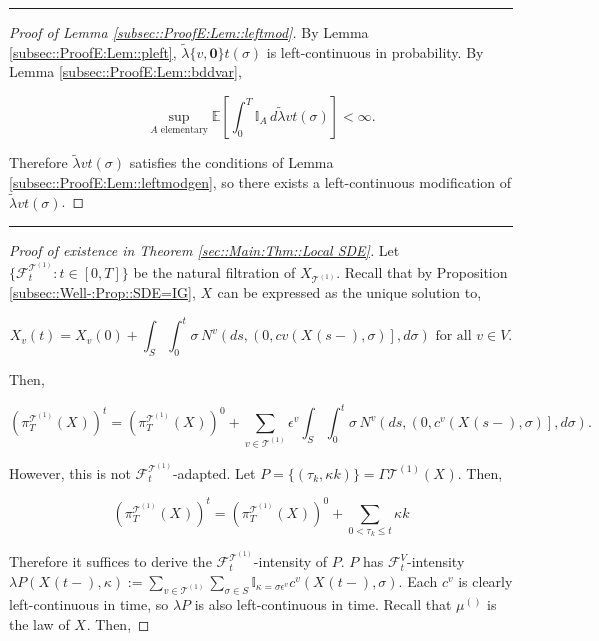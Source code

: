 \documentclass[12pt]{article}
\newcommand{\mb}{\mathbb}
\newcommand{\mc}{\mathcal}
\newcommand{\te}{\text}
\newcommand{\ep}{\epsilon}
\newcommand{\lin}{\rule{\linewidth}{0.4 pt}}
\newcommand{\ex}[1]{\mb{E}\left[#1\right]}			%
\renewcommand{\root}{\mathbf{0}}				%
\renewcommand{\v}{v}							%
\renewcommand{\S}{S}							%
\newcommand{\s}{\sigma}							%
\newcommand{\ev}{\ep}							%
\newcommand{\T}{T}								%
\renewcommand{\t}{t}							%
\newcommand{\proj}{\pi}							%
\renewcommand{\tt}{s}							%
\newcommand{\F}{\mc{F}}							%
\newcommand{\X}{X}								%
\newcommand{\IGr}{c}							%
\newcommand{\vind}[1]{^{#1}}					%
\newcommand{\vsi}[1]{^{#1}}						%
\newcommand{\cind}[1]{_{#1}}					%
\newcommand{\tp}[1]{(#1)}						%
\newcommand{\tip}[1]{#1}						%
\newcommand{\ts}[1]{_{#1}}						%
\newcommand{\tree}{\mc{T}}						%
\newcommand{\sln}[1]{^{(#1)}}					%
\newcommand{\poiss}{N}							%
\newcommand{\rate}{\lambda}						%
\newcommand{\alt}[1]{\widetilde{#1}}			%
\newcommand{\indx}[1]{_{#1}}					%
\newcommand{\m}{\mu}							%
\newcommand{\rt}{\tau}							%
\renewcommand{\it}{k}							%
\newcommand{\pmap}{\Gamma}						%
\renewcommand{\mark}{\kappa}					%
\newcommand{\rp}{P}								%
\newcommand{\typset}{A}							%
\newcommand{\crate}{\alt{\lambda}}				%
\begin{document}
\lin

\begin{proof}[Proof of Lemma \ref{subsec::ProofE:Lem::leftmod}]

By Lemma \ref{subsec::ProofE:Lem::pleft}, \(\crate{\{\v,\root\}}{\t}(\s)\) is left-continuous in probability. By Lemma \ref{subsec::ProofE:Lem::bddvar},

\[\sup_{\typset\te{ elementary}} \ex{\int_0^\T \mb{I}_{\typset}\,d\crate{\v}{\t}(\s)} < \infty.\]

Therefore \(\crate{\v}{\t}(\s)\) satisfies the conditions of Lemma \ref{subsec::ProofE:Lem::leftmodgen}, so there exists a left-continuous modification of \(\crate{\v}{\t}(\s)\).
\end{proof}

\lin

\begin{proof}[Proof of existence in Theorem \ref{sec::Main:Thm::Local SDE}]

Let \(\{\F\vsi{\tree\sln{1}}\ts{\t}:\t\in [0,\T]\}\) be the natural filtration of \(\X\cind{\tree\sln{1}}\tip{}\). Recall that by Proposition \ref{subsec::Well-:Prop::SDE=IG}, \(\X\cind{}\tip{}\) can be expressed as the unique solution to,

\[\X\cind{\v}\tp{\t} = \X\cind{\v}\tp{0} + \int_\S\int_0^\t \s\,\poiss\vind{\v}\left(d\tt,\left(0,c{\v}(\X\cind{}\tp{\tt-},\s)\right],d\s\right) \te{ for all } \v \in V.\]

Then,

\[\left(\proj\vsi{\tree\sln{1}}\ts{\T}(\X\cind{}\tip{})\right)^\t = \left(\proj\vsi{\tree\sln{1}}\ts{\T}(\X\cind{}\tip{})\right)^0 + \sum_{\v \in \tree\sln{1}}\ev\vind{\v}\int_\S\int_0^\t \s\,\poiss\vind{\v}\left(d\tt,\left(0,\IGr\vind{\v}(\X\cind{}\tp{\tt-},\s)\right],d\s\right).\]

However, this is not \(\F\vsi{\tree\sln{1}}\ts{\t}\)-adapted. Let \(\rp{} = \{(\rt\indx{\it},\mark{\it})\} = \pmap{\tree\sln{1}}(\X\cind{}\tip{}).\) Then,

\[\left(\proj\vsi{\tree\sln{1}}\ts{\T}(\X\cind{}\tip{})\right)^\t = \left(\proj\vsi{\tree\sln{1}}\ts{\T}(\X\cind{}\tip{})\right)^0 + \sum_{0 < \rt\indx{\it} \leq \t}\mark{\it}\]

Therefore it suffices to derive the \(\F\vsi{\tree\sln{1}}\ts{\t}\)-intensity of \(\rp{}\). \(\rp{}\) has \(\F\vsi{V}\ts{\t}\)-intensity \(\rate{\rp{}}(\X\cind{}\tp{\t-},\mark{}) := \sum_{\v \in \tree\sln{1}}\sum_{\s\in \S}\mb{I}_{\mark{} = \s\ev\vind{\v}}\IGr\vind{\v}(\X\cind{}\tp{\t-},\s)\). Each \(\IGr\vind{\v}\) is clearly left-continuous in time, so \(\rate{\rp{}}\) is also left-continuous in time. Recall that \(\m\sln{}\ts{}\) is the law of \(\X\cind{}\tip{}\). Then,


\end{proof}
\end{document}
